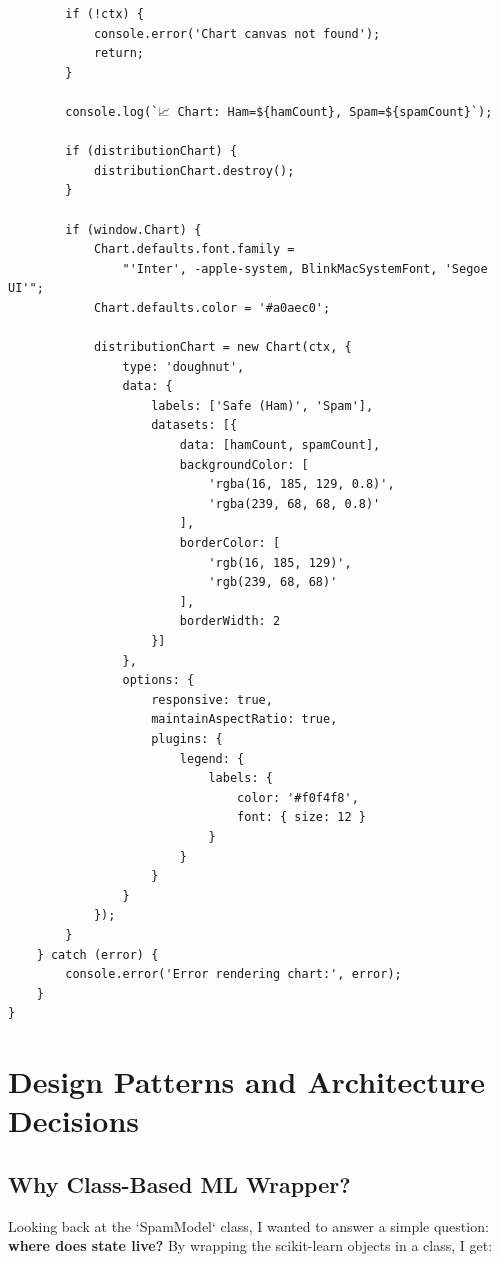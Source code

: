 \documentclass[12pt, a4paper]{article}
\begin{document}
\begin{verbatim}
        if (!ctx) {
            console.error('Chart canvas not found');
            return;
        }
        
        console.log(`📈 Chart: Ham=${hamCount}, Spam=${spamCount}`);
        
        if (distributionChart) {
            distributionChart.destroy();
        }
        
        if (window.Chart) {
            Chart.defaults.font.family = 
                "'Inter', -apple-system, BlinkMacSystemFont, 'Segoe UI'";
            Chart.defaults.color = '#a0aec0';
            
            distributionChart = new Chart(ctx, {
                type: 'doughnut',
                data: {
                    labels: ['Safe (Ham)', 'Spam'],
                    datasets: [{
                        data: [hamCount, spamCount],
                        backgroundColor: [
                            'rgba(16, 185, 129, 0.8)',
                            'rgba(239, 68, 68, 0.8)'
                        ],
                        borderColor: [
                            'rgb(16, 185, 129)',
                            'rgb(239, 68, 68)'
                        ],
                        borderWidth: 2
                    }]
                },
                options: {
                    responsive: true,
                    maintainAspectRatio: true,
                    plugins: {
                        legend: {
                            labels: {
                                color: '#f0f4f8',
                                font: { size: 12 }
                            }
                        }
                    }
                }
            });
        }
    } catch (error) {
        console.error('Error rendering chart:', error);
    }
}
\end{verbatim}

\section{Design Patterns and Architecture Decisions}

\subsection{Why Class-Based ML Wrapper?}

Looking back at the `SpamModel` class, I wanted to answer a simple question: \textbf{where does state live?} By wrapping the scikit-learn objects in a class, I get:
\end{document}
